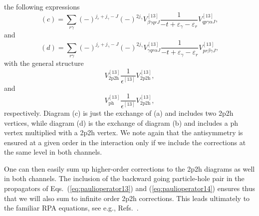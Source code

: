 \documentclass[twoside,12pt]{article}
\begin{document}
the following expressions
\begin{equation}
      (c)=\sum_{r\gamma}(-)^{j_r+j_{\gamma}-J}
      (-)^{2j_{\gamma}}
      V^{[13]}_{\beta\gamma qr J}
      \frac{1}{-t+\varepsilon_{\gamma}-
                \varepsilon_{r}} V^{[13]}_{qp\gamma\alpha J},
       \label{eq:2p2hc}
\end{equation}
and
\begin{equation}
      (d)=\sum_{r\gamma}(-)^{j_r+j_{\gamma}-J}
      (-)^{2j_{\gamma}}
      V^{[13]}_{\gamma q r\alpha J}
      \frac{1}{-t+\varepsilon_{\gamma}-
                \varepsilon_{r}} V^{[13]}_{pr\beta\gamma J},
       \label{eq:2p2hd}
\end{equation}
with the general structure
\begin{equation}
    V_{\mathrm{2p2h}}^{[13]}
     \frac{1}{\epsilon^{[13]}}
     V_{\mathrm{2p2h}}^{[13]},
\end{equation}
and
\begin{equation}
    V_{\mathrm{ph}}^{[13]}
     \frac{1}{\epsilon^{[13]}}
     V_{\mathrm{2p2h}}^{[13]},
\end{equation}
respectively. Diagram (c) is just the exchange of (a)
and includes two 2p2h vertices, while diagram (d) is the exchange
of diagram (b) and includes a ph vertex multiplied with
a 2p2h vertex. We note again that the antisymmetry is
ensured at a given order in the interaction only
if we include the corrections at the same level in both
channels.

One can then easily sum up higher-order corrections
to the 2p2h diagrams as well in both channels.
The inclusion of the backward going particle-hole
pair in the propagators of Eqs.\ (\ref{eq:paulioperator13})
and (\ref{eq:paulioperator14}) ensures thus that we will
also sum to infinite order 2p2h corrections.
This leads ultimately to the familiar RPA equations,
see e.g., Refs.\ \cite{eo77}.
\end{document}
